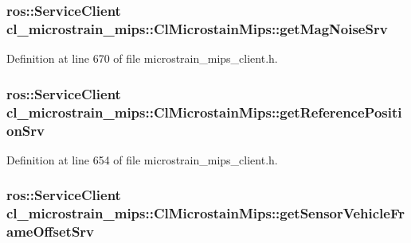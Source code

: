 \subsubsection[{\texorpdfstring{get\+Mag\+Noise\+Srv}{getMagNoiseSrv}}]{\setlength{\rightskip}{0pt plus 5cm}ros\+::\+Service\+Client cl\+\_\+microstrain\+\_\+mips\+::\+Cl\+Microstain\+Mips\+::get\+Mag\+Noise\+Srv\hspace{0.3cm}{\ttfamily [protected]}}\hypertarget{classcl__microstrain__mips_1_1ClMicrostainMips_a858136430bc226e36390517f28687a2a}{}\label{classcl__microstrain__mips_1_1ClMicrostainMips_a858136430bc226e36390517f28687a2a}


Definition at line 670 of file microstrain\+\_\+mips\+\_\+client.\+h.

\subsubsection[{\texorpdfstring{get\+Reference\+Position\+Srv}{getReferencePositionSrv}}]{\setlength{\rightskip}{0pt plus 5cm}ros\+::\+Service\+Client cl\+\_\+microstrain\+\_\+mips\+::\+Cl\+Microstain\+Mips\+::get\+Reference\+Position\+Srv\hspace{0.3cm}{\ttfamily [protected]}}\hypertarget{classcl__microstrain__mips_1_1ClMicrostainMips_a1f9b56f826c67a2e1d8a33e0879053bc}{}\label{classcl__microstrain__mips_1_1ClMicrostainMips_a1f9b56f826c67a2e1d8a33e0879053bc}


Definition at line 654 of file microstrain\+\_\+mips\+\_\+client.\+h.

\subsubsection[{\texorpdfstring{get\+Sensor\+Vehicle\+Frame\+Offset\+Srv}{getSensorVehicleFrameOffsetSrv}}]{\setlength{\rightskip}{0pt plus 5cm}ros\+::\+Service\+Client cl\+\_\+microstrain\+\_\+mips\+::\+Cl\+Microstain\+Mips\+::get\+Sensor\+Vehicle\+Frame\+Offset\+Srv\hspace{0.3cm}{\ttfamily [protected]}}\hypertarget{classcl__microstrain__mips_1_1ClMicrostainMips_a12957749416c955e1b0132cb2213f879}{}\label{classcl__microstrain__mips_1_1ClMicrostainMips_a12957749416c955e1b0132cb2213f879}


